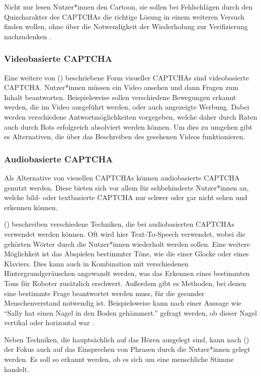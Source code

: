 Nicht nur lesen Nutzer*innen den Cartoon, sie sollen bei Fehlschlägen durch den Quizcharakter des CAPTCHAs die richtige Lösung in einem weiteren Versuch finden wollen,
ohne über die Notwendigkeit der Wiederholung zur Verifizierung nachzudenken \cite[p.41ff]{gamified}. 

\subsubsection*{Videobasierte CAPTCHA}
Eine weitere von \citeauthor{surveyofresearch} (\cite[p.79]{surveyofresearch}) beschriebene Form visueller CAPTCHAs sind videobasierte CAPTCHA. 
Nutzer*innen müssen ein Video ansehen und dann Fragen zum Inhalt beantworten.
Beispielsweise sollen verschiedene Bewegungen erkannt werden, die im Video ausgeführt werden,
oder auch angezeigte Werbung.
Dabei werden verschiedene Antwortmöglichkeiten vorgegeben, welche daher durch Raten auch durch Bots erfolgreich absolviert werden können.
Um dies zu umgehen gibt es Alternativen, die über das Beschreiben des gesehenen Videos funktionieren. 

\subsubsection*{Audiobasierte CAPTCHA}
Als Alternative von visuellen CAPTCHAs können audiobasierte CAPTCHA genutzt werden.
Diese bieten sich vor allem für sehbehinderte Nutzer*innen an, welche bild- oder textbasierte CAPTCHA nur schwer oder gar nicht sehen und erkennen können.

\citeauthor{surveyofresearch} (\cite[p.78]{surveyofresearch}) beschreiben verschiedene Techniken, die bei audiobasierten CAPTCHAs verwendet werden können.
Oft wird hier Text-To-Speech verwendet, wobei die gehörten Wörter durch die Nutzer*innen wiederholt werden sollen.
Eine weitere Möglichkeit ist das Abspielen bestimmter Töne, wie die einer Glocke oder eines Klaviers. 
Dies kann auch in Kombination mit verschiedenen Hintergrundgeräuschen angewandt werden, was das Erkennen eines bestimmten Tons für Roboter zusätzlich erschwert.
Außerdem gibt es Methoden, bei denen eine bestimmte Frage beantwortet werden muss, für die gesunder Menschenverstand notwendig ist. 
Beispielsweise kann nach einer Aussage wie ``Sally hat einen Nagel in den Boden gehämmert.'' gefragt werden, ob dieser Nagel vertikal oder horizontal war \cite[p.3]{commonsense}. 

Neben Techniken, die hauptsächlich auf das Hören ausgelegt sind, kann nach \citeauthor{surveyofresearch} (\cite[p.78]{surveyofresearch}) der Fokus auch auf das Einsprechen von Phrasen durch die Nutzer*innen gelegt werden.
Es soll so erkannt werden, ob es sich um eine menschliche Stimme handelt.


